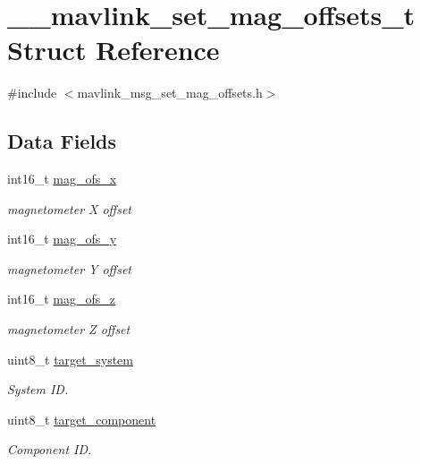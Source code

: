 \hypertarget{struct____mavlink__set__mag__offsets__t}{\section{\+\_\+\+\_\+mavlink\+\_\+set\+\_\+mag\+\_\+offsets\+\_\+t Struct Reference}
\label{struct____mavlink__set__mag__offsets__t}
}


{\ttfamily \#include $<$mavlink\+\_\+msg\+\_\+set\+\_\+mag\+\_\+offsets.\+h$>$}

\subsection*{Data Fields}
\begin{DoxyCompactItemize}
\item 
int16\+\_\+t \hyperlink{struct____mavlink__set__mag__offsets__t_af49ca003f5d855c078265cf437a3f0fa}{mag\+\_\+ofs\+\_\+x}
\begin{DoxyCompactList}\small\item\em magnetometer X offset \end{DoxyCompactList}\item 
int16\+\_\+t \hyperlink{struct____mavlink__set__mag__offsets__t_a51560e6505af43419a84ec5e5414b723}{mag\+\_\+ofs\+\_\+y}
\begin{DoxyCompactList}\small\item\em magnetometer Y offset \end{DoxyCompactList}\item 
int16\+\_\+t \hyperlink{struct____mavlink__set__mag__offsets__t_a3e05e29b57e8ef8d859743d56b428a7c}{mag\+\_\+ofs\+\_\+z}
\begin{DoxyCompactList}\small\item\em magnetometer Z offset \end{DoxyCompactList}\item 
uint8\+\_\+t \hyperlink{struct____mavlink__set__mag__offsets__t_ae337dc4aa082f9004dde4ac022e20251}{target\+\_\+system}
\begin{DoxyCompactList}\small\item\em System I\+D. \end{DoxyCompactList}\item 
uint8\+\_\+t \hyperlink{struct____mavlink__set__mag__offsets__t_a1a7ce0b0f0c38669f8f5419f4a0b83e7}{target\+\_\+component}
\begin{DoxyCompactList}\small\item\em Component I\+D. \end{DoxyCompactList}\end{DoxyCompactItemize}


